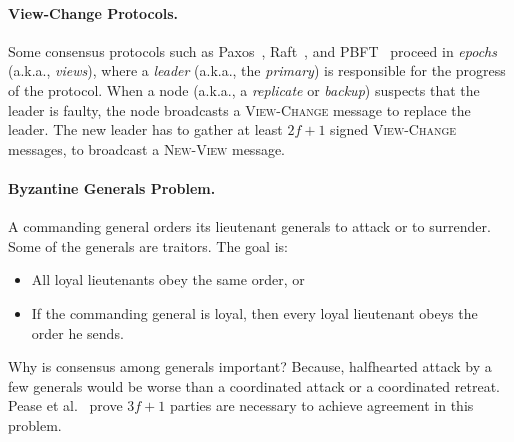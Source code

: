 \documentclass[11pt]{article}
\theoremstyle{mytheoremstyle}
\begin{document}
\paragraph{View-Change Protocols.} Some consensus protocols such as Paxos~\cite{Lamport:1998:Paxos}, Raft~\cite{Raft:2014}, and PBFT~\cite{Castro:1999:PBFT} proceed in \emph{epochs} (a.k.a., \emph{views}), where a \emph{leader} (a.k.a., the \emph{primary}) is responsible for the progress of the protocol. When a node (a.k.a., a \emph{replicate} or \emph{backup}) suspects that the leader is faulty, the node broadcasts a \textsc{View-Change} message to replace the leader. The new leader has to gather at least $2f+1$ signed \textsc{View-Change} messages, to broadcast a \textsc{New-View} message.

\paragraph{Byzantine Generals Problem.} A commanding general orders its lieutenant generals to attack or to surrender. Some of the generals are traitors. The goal is:
\begin{itemize}
	\item All loyal lieutenants obey the same order, or
	\item If the commanding general is loyal, then every loyal lieutenant obeys the order he sends.
\end{itemize}

Why is consensus among generals important? Because, halfhearted attack by a few generals would be worse than a coordinated attack or a coordinated retreat. Pease et al.~\cite{pease80reaching} prove $3f+1$ parties are necessary to achieve agreement in this problem.


\end{document}
